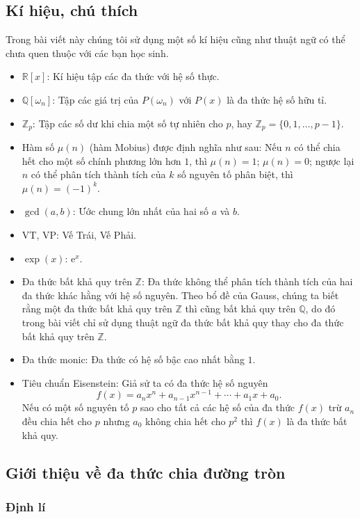 \subsection{Kí hiệu, chú thích}
Trong bài viết này chúng tôi sử dụng một số kí hiệu cũng như thuật ngữ có thể chưa quen thuộc
với các bạn học sinh.
\begin{itemize}
	\item $\mathbb{R}[x]$: Kí hiệu tập các đa thức với hệ số thực.
	\item $\mathbb{Q}[\omega _n]$: Tập các giá trị của $P(\omega_n)$ với $P(x)$ là đa thức hệ số hữu tỉ.
	\item  $\mathbb{Z}_p$: Tập các số dư khi chia một số tự nhiên cho $p$, hay $\mathbb{Z}_p=\{0,1,\ldots,p-1\}.$
	\item Hàm số $\mu(n)$ (hàm Mobius) được định nghĩa như sau: Nếu $n$ có thể chia hết cho một số chính phương lớn hơn $1$, thì $\mu(n)=1$; $\mu(n) = 0$; ngược lại $n$ có thể phân tích thành tích của $k$ số nguyên tố phân biệt, thì $\mu(n)=(-1)^k$.  
	\item $\gcd(a,b)$: Ước chung lớn nhất của hai số $a$ và $b$.
	\item VT, VP: Vế Trái, Vế Phải.
	\item $\exp(x)$: $\mathrm{e}^x$.
	\item Đa thức bất khả quy trên $\mathbb{Z}$: Đa thức không thể phân tích thành tích của hai đa thức khác hằng với hệ số nguyên. Theo bổ đề của Gauss, chúng ta biết rằng một đa thức bất khả quy trên $\mathbb{Z}$ thì cũng bất khả quy trên $\mathbb{Q}$, do đó trong bài viết chỉ sử dụng thuật ngữ đa thức bất khả quy thay cho đa thức bất khả quy trên $\mathbb{Z}.$
	\item Đa thức monic: Đa thức có hệ số bậc cao nhất bằng $1$.
	\item Tiêu chuẩn Eisenstein: Giả sử ta có đa thức hệ số nguyên $$f(x) = a_{n}x^n+a_{n-1}x^{n-1} + \cdots + a_1x+a_0.$$
	Nếu có một số nguyên tố $p$ sao cho tất cả các hệ số của đa thức $f(x)$ trừ $a_n$ đều chia hết cho $p$ nhưng $a_0$ không chia hết cho $p^2$ thì $f(x)$ là đa thức bất khả quy.
	
\end{itemize}

\subsection{Giới thiệu về đa thức chia đường tròn}

\subsubsection{Định lí}

